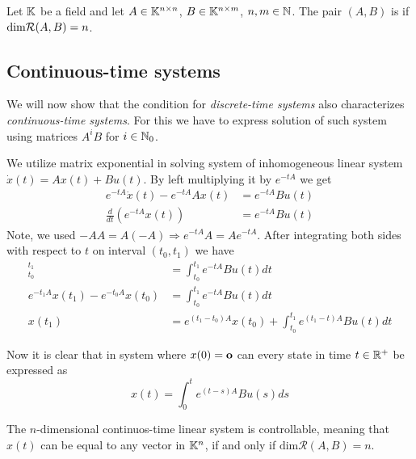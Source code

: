 \begin{definition}
	Let $\mathbb{K}$ be a field and let $A \in \mathbb{K}^{n \times n}$, $B \in \mathbb{K}^{n \times m}$, $n,m \in \mathbb{N}$. The pair $(A,B)$ is  if $\textnormal{dim}\mathcal{R}(A,B)=n$.
\end{definition}

\subsection{Continuous-time systems}

We will now show that the condition for \textit{discrete-time systems} also characterizes \textit{continuous-time systems}. For this we have to express solution of such system using matrices $A^iB$ for $i\in \mathbb{N}_0$. 

We utilize matrix exponential in solving system of inhomogeneous linear system $\dot{x}(t)=Ax(t)+Bu(t)$. By left multiplying it by $e^{-tA}$ we get
\begin{align*}
	e^{-tA}\dot{x}(t)-e^{-tA}Ax(t) &=e^{-tA}Bu(t) \\
	\frac{d}{dt} (e^{-tA}x(t)) &=e^{-tA}Bu(t) 
\end{align*}
Note, we used $-AA=A(-A)\Rightarrow e^{-tA}A=Ae^{-tA}$. After integrating both sides with respect to $t$ on interval $(t_0,t_1)$ we have 
\begin{align*}
	[e^{-tA}x(t)]^{t_1}_{t_0}&=\int^{t_1}_{t_0}e^{-tA}Bu(t)dt \\
	e^{-t_1A}x(t_1)-e^{-t_0A}x(t_0)&=\int^{t_1}_{t_0}e^{-tA}Bu(t)dt \\
	x(t_1)&=e^{(t_1-t_0)A}x(t_0)+\int^{t_1}_{t_0}e^{(t_1-t)A}Bu(t)dt
\end{align*}

Now it is clear that in system where $x(0)=\textbf{o}$ can every state in time $t\in \mathbb{R}^+$ be expressed as $$x(t)=\int^t_0 e^{(t-s)A}Bu(s)ds$$

\begin{theorem}
	The $n$-dimensional continuos-time linear system is controllable, meaning that $x(t)$ can be equal to any vector in $\mathbb{K}^n$, if and only if $\text{dim}\mathcal{R}(A,B)=n$.
\end{theorem}

